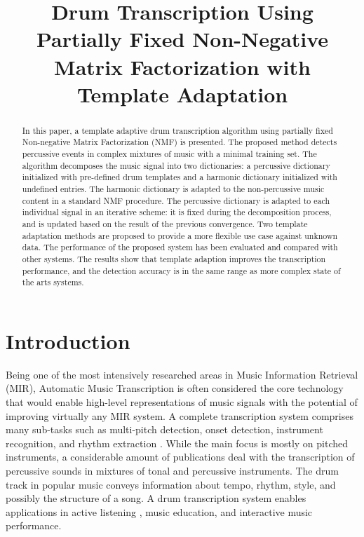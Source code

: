 \documentclass{article}
\title{Drum Transcription Using Partially Fixed Non-Negative Matrix Factorization with Template Adaptation}
\begin{document}
%
\maketitle
%
\begin{abstract}
In this paper, a template adaptive drum transcription algorithm using partially fixed Non-negative Matrix Factorization (NMF) is presented. The proposed method detects percussive events in complex mixtures of music with a minimal training set. The algorithm decomposes the music signal into two dictionaries: a percussive dictionary initialized with pre-defined drum templates and a harmonic dictionary initialized with undefined entries. The harmonic dictionary is adapted to the non-percussive music content in a standard NMF procedure. The percussive dictionary is adapted to each individual signal in an iterative scheme: it is fixed during the decomposition process, and is updated based on the result of the previous convergence. Two template adaptation methods are proposed to provide a more flexible use case against unknown data. The performance of the proposed system has been evaluated and compared with other systems. The results show that template adaption improves the transcription performance, and the detection accuracy is in the same range as more complex state of the arts systems.  

\end{abstract}
%

\section{Introduction}\label{sec:introduction}
Being one of the most intensively researched areas in Music Information Retrieval (MIR), Automatic Music Transcription is often considered the core technology that would enable high-level representations of music signals with the potential of improving virtually any MIR system. A complete transcription system comprises many sub-tasks such as multi-pitch detection, onset detection, instrument recognition, and rhythm extraction \cite{benetos_automatic_2013}. While the main focus is mostly on pitched instruments, a considerable amount of publications deal with the transcription of percussive sounds in mixtures of tonal and percussive instruments. The drum track in popular music conveys information about tempo, rhythm, style, and possibly the structure of a song. A drum transcription system enables applications in active listening \cite{yoshii_drumix:_2007}, music education, and interactive music performance.
\end{document}
